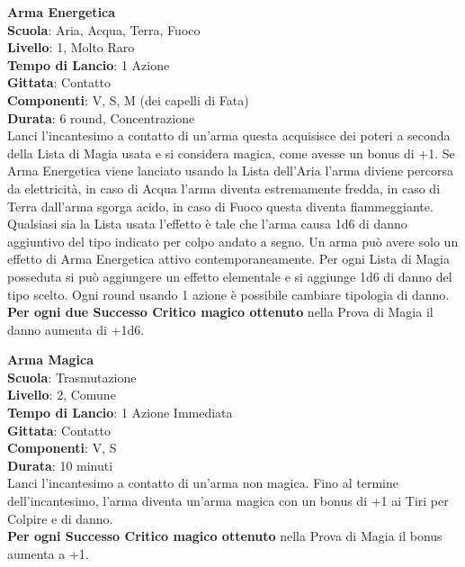 \begin{multicols}{2}
\medskip\textbf{Arma Energetica}\\
\textbf{Scuola}: Aria, Acqua, Terra, Fuoco\\
\textbf{Livello}: 1, Molto Raro\\
\textbf{Tempo di Lancio}: 1 Azione\\
\textbf{Gittata}: Contatto\\
\textbf{Componenti}: V, S, M (dei capelli di Fata)\\
\textbf{Durata}: 6 round, Concentrazione\\
Lanci l'incantesimo a contatto di un'arma questa acquisisce dei poteri a seconda della Lista di Magia usata e si considera magica, come avesse un bonus di +1.
Se Arma Energetica viene lanciato usando la Lista dell'Aria l'arma diviene percorsa da elettricità, in caso di Acqua l'arma diventa estremamente fredda, in caso di Terra dall'arma sgorga acido, in caso di Fuoco questa diventa fiammeggiante. Qualsiasi sia la Lista usata l'effetto è tale che l'arma causa 1d6 di danno aggiuntivo del tipo indicato per colpo andato a segno.
Un arma può avere solo un effetto di Arma Energetica attivo contemporaneamente.
Per ogni Lista di Magia posseduta si può aggiungere un effetto elementale e si aggiunge 1d6 di danno del tipo scelto. Ogni round usando 1 azione è possibile cambiare tipologia di danno.\\
\textbf{Per ogni due Successo Critico magico ottenuto} nella Prova di Magia il danno aumenta di +1d6.

\medskip\textbf{Arma Magica}\\
\textbf{Scuola}: Trasmutazione\\
\textbf{Livello}: 2, Comune\\
\textbf{Tempo di Lancio}: 1 Azione Immediata\\
\textbf{Gittata}: Contatto\\
\textbf{Componenti}: V, S\\
\textbf{Durata}: 10 minuti\\
Lanci l'incantesimo a contatto di un'arma non magica. Fino al termine dell'incantesimo, l'arma diventa un'arma magica con un bonus di +1 ai Tiri per Colpire e di danno.\\
\textbf{Per ogni Successo Critico magico ottenuto} nella Prova di Magia il bonus aumenta a +1.


\end{multicols}
